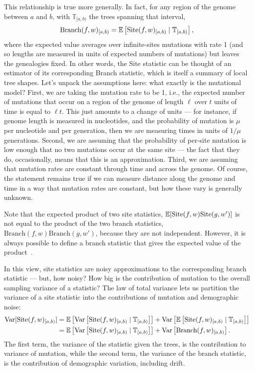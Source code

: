 \documentclass{article}
\newcommand{\branch}{\mbox{Branch}} %
\newcommand{\site}{\mbox{Site}} %
\newcommand{\given}{\;\vert\;}
\newcommand{\treeseq}{\mathbb{T}} %
\newcommand{\iw}{w} %
\begin{document}
This relationship is true more generally.
In fact, for any region of the genome between $a$ and $b$,
with $\treeseq_{[a,b)}$ the trees spanning that interval,
\begin{align}
    \branch(f, \iw)_{[a,b)}
    =
    \E\left[ \site(f, \iw)_{[a,b)} \given \treeseq_{[a,b)} \right] ,
\end{align}
where the expected value averages over infinite-sites mutations with rate 1
(and so lengths are measured in units of expected numbers of mutations)
but leaves the genealogies fixed.
In other words, the Site statistic can be thought of an estimator of its corresponding Branch statistic,
which is itself a summary of local tree shapes.
Let's unpack the assumptions here: what exactly is the mutational model?
First, we are taking the mutation rate to be 1, i.e.,
the expected number of mutations that occur on a region of the genome of length $\ell$
over $t$ units of time is equal to $\ell t$.
This just amounts to a change of units ---
for instance, if genome length is measured in nucleotides,
and the probability of mutation is $\mu$ per nucleotide and per generation,
then we are measuring times in units of $1/\mu$ generations.
Second, we are assuming that the probability of per-site mutation is low enough
that no two mutations occur at the same site
--- the fact that they do, occasionally, means that this is an approximation.
Third, we are assuming that mutation rates are constant through time and across the genome.
Of course, the statement remains true if we can measure distance along the genome and time
in a way that mutation rates are constant, but how these vary is generally unknown.

Note that the expected product of two site statistics,
$\E[\site(f, \iw) \site(g, \iw')]$
is not equal to the product of the two branch statistics, $\branch(f, \iw) \branch(g, \iw')$,
because they are not independent.
However, it is always possible to define a branch statistic that
gives the expected value of the product~\citep{ralph2019empirical}.

In this view,
site statistics are noisy approximations to the corresponding branch statistic
--- but, how noisy?
How big is the contribution of mutation to the overall sampling variance of a statistic?
The law of total variance lets us partition the variance of a site statistic
into the contributions of mutation and demographic noise:
\begin{align*}
    \var[\site(f, \iw)_{[a,b)}]
    &=
        \E\left[ \var\left[\site(f, \iw)_{[a,b)} \given \treeseq_{[a,b)}\right] \right]
        + \var\left[ \E\left[\site(f, \iw)_{[a,b)} \given \treeseq_{[a,b)}\right] \right] \\
    &=
        \E\left[ \var\left[\site(f, \iw)_{[a,b)} \given \treeseq_{[a,b)}\right] \right]
        + \var\left[ \branch(f, \iw)_{[a,b)} \right] .
\end{align*}
The first term, the variance of the statistic given the trees,
is the contribution to variance of mutation,
while the second term, the variance of the branch statistic,
is the contribution of demographic variation, including drift.
\end{document}
